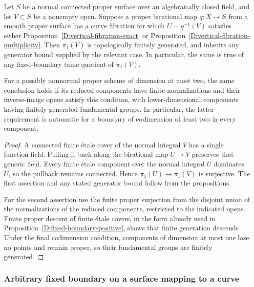 \begin{corollary}
\label{D:vertical-fibration-models}
Let $S$ be a normal connected proper surface over an
algebraically closed field, and let $V\subset S$ be a nonempty
open.  Suppose a proper birational map $q:X\to S$ from a
smooth proper surface has a curve fibration for which
$U=q^{-1}(V)$ satisfies either
Proposition~\ref{D:vertical-fibration-exact} or
Proposition~\ref{D:vertical-fibration-multiplicity}.
Then $\pi_1(V)$ is topologically finitely generated, and inherits any generator bound supplied by the relevant case.  In particular, the same is
true of any fixed-boundary tame quotient of $\pi_1(V)$.

For a possibly nonnormal proper scheme of dimension at most
two, the same conclusion holds if its reduced components have
finite normalizations and their inverse-image opens satisfy
this condition, with lower-dimensional components having
finitely generated fundamental groups.  In particular, the
latter requirement is automatic for a boundary of codimension
at least two in every component.
\end{corollary}
\begin{proof}
A connected finite \'etale cover of the normal integral $V$
has a single function field.  Pulling it back along the
birational map $U\to V$ preserves that generic field.  Every
finite \'etale component over the normal integral $U$
dominates $U$, so the pullback remains connected.  Hence
$\pi_1(U)\to\pi_1(V)$ is surjective.  The first assertion and any stated generator bound follow from the propositions.

For the second assertion use the finite proper surjection
from the disjoint union of the normalizations of the reduced
components, restricted to the indicated opens.  Finite proper
descent of finite \'etale covers, in the form already used in
Proposition~\ref{D:fixed-boundary-positive}, shows that finite
generation descends
\cite[IX, Corollary 5.2]{SGA1}.  Under the final codimension
condition, components of dimension at most one lose no points
and remain proper, so their fundamental groups are finitely
generated.
\end{proof}

\subsubsection{Arbitrary fixed boundary on a surface mapping to a curve}


